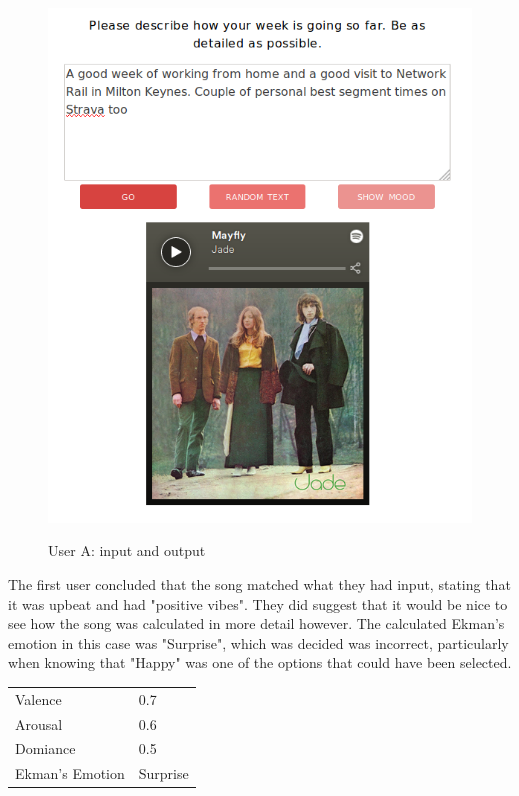 \begin{figure}[ht]
\caption{User A: input and output}
\centering
\includegraphics[scale=0.4]{implementation/malc-user.png}
\label{user:1}
\end{figure}

The first user concluded that the song matched what they had input, stating that it was upbeat and had "positive vibes". They did suggest that it would be nice to see how the song was calculated in more detail however. The calculated Ekman's emotion in this case was "Surprise", which was decided was incorrect, particularly when knowing that "Happy" was one of the options that could have been selected.

\begin{table}[h]
\centering
\begin{tabular}{|l|l|}
\hline
 Valence &  0.7\\
 Arousal &  0.6\\
 Domiance &  0.5\\
 Ekman's Emotion &  Surprise\\ \hline
\end{tabular}
\end{table}

